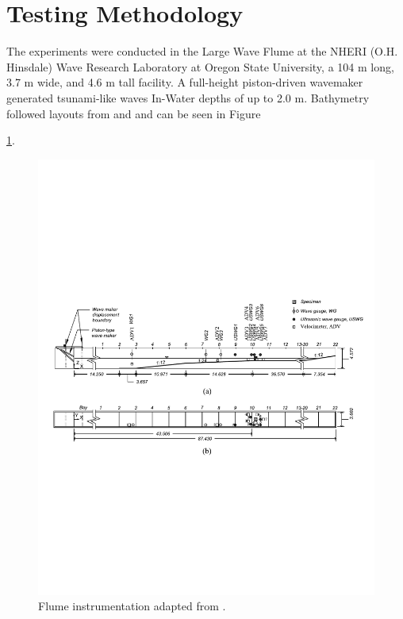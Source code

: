 \documentclass{article}
\begin{document}
\section{Testing Methodology}
The experiments were conducted in the Large Wave Flume at the NHERI (O.H. Hinsdale) Wave Research Laboratory at Oregon State University, a 104 m long, 3.7 m wide, and 4.6 m tall facility. A full-height piston-driven wavemaker generated tsunami-like waves In-Water depths of up to 2.0 m. Bathymetry followed layouts from \citep{winterTsunamiLikeWaveForces2020} and \citep{Shekhar2020} and can be seen in Figure {\ref{fig:waveflume}.
 
\begin{figure}[htbp]
  \centering
  \includegraphics[width=1.2\textwidth]{WaveFlume.pdf}
  \caption{ Flume instrumentation adapted from \citep{winterTsunamiLikeWaveForces2020}.}
  \label{fig:waveflume}
\end{figure}

}
\end{document}
